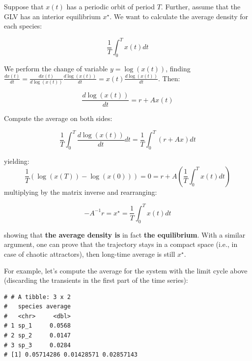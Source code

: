 \documentclass[]{book}
\newenvironment{Shaded}{\begin{snugshade}}{\end{snugshade}}
\newcommand{\CommentTok}[1]{\textcolor[rgb]{0.56,0.35,0.01}{\textit{#1}}}
\newcommand{\DataTypeTok}[1]{\textcolor[rgb]{0.13,0.29,0.53}{#1}}
\newcommand{\DecValTok}[1]{\textcolor[rgb]{0.00,0.00,0.81}{#1}}
\newcommand{\KeywordTok}[1]{\textcolor[rgb]{0.13,0.29,0.53}{\textbf{#1}}}
\newcommand{\NormalTok}[1]{#1}
\newcommand{\OperatorTok}[1]{\textcolor[rgb]{0.81,0.36,0.00}{\textbf{#1}}}
\newcommand{\StringTok}[1]{\textcolor[rgb]{0.31,0.60,0.02}{#1}}
\begin{document}
Suppose that \(x(t)\) has a periodic orbit of period \(T\). Further, assume that the GLV has an interior equilibrium \(x^\star\). We want to calculate the average density for each species:

\[
\frac{1}{T} \int_0^T x(t) dt
\]

We perform the change of variable \(y = \log(x(t))\), finding \(\frac{d x(t)}{dt} = \frac{d x(t)}{d \log(x(t))}\frac{d \log(x(t))}{dt} = x(t)\frac{d \log(x(t))}{dt}\). Then:

\[
\frac{d \log(x(t))}{dt} = r + Ax(t)
\]

Compute the average on both sides:

\[
\frac{1}{T}\int_0^T \frac{d \log(x(t))}{dt} dt= \frac{1}{T}\int_0^T \left(r + Ax \right) dt
\]

yielding:
\[
\frac{1}{T}(\log(x(T)) - \log(x(0))) = 0 = r + A \left( \frac{1}{T} \int_0^T x(t) dt \right)
\]
multiplying by the matrix inverse and rearranging:

\[
-A^{-1} r = x^\star =  \frac{1}{T} \int_0^T x(t) dt 
\]

showing that \textbf{the average density is} in fact \textbf{the equilibrium}. With a similar argument, one can prove that the trajectory stays in a compact space (i.e., in case of chaotic attractors), then long-time average is still \(x^\star\).

For example, let's compute the average for the system with the limit cycle above (discarding the transients in the first part of the time series):

\begin{Shaded}
\end{Shaded}

\begin{verbatim}
# # A tibble: 3 x 2
#   species average
#   <chr>     <dbl>
# 1 sp_1     0.0568
# 2 sp_2     0.0147
# 3 sp_3     0.0284
# [1] 0.05714286 0.01428571 0.02857143
\end{verbatim}
\end{document}
